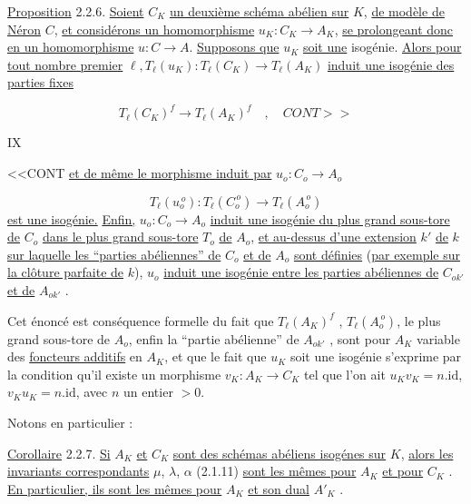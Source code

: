 \underline{Proposition} 2.2.6. \underline{Soient} $C_{K}$ \underline{un deuxième schéma abélien sur} $K$, \underline{de modèle de Néron} $C$, \underline{et considérons un homomorphisme} $u_{K}:C_{K} \longrightarrow A_{K}$, \underline{se prolongeant donc en un homomorphisme} $u: C \longrightarrow A$. \underline{Supposons que} $u_{K}$ \underline{soit une} isogénie. \underline{Alors pour tout nombre premier} $\ell,T_{\ell}(u_{K}):T_{\ell}(C_{K}) \longrightarrow T_{\ell}(A_{K})$ \underline{induit une isogénie des parties fixes}

\begin{equation}\tag{2.2.6.1}
T_{\ell}(C_{K})^{f} \longrightarrow T_{\ell}(A_{K})^{f} \quad , \quad CONT>>
\end{equation}



IX

<<CONT \underline{et de même le morphisme induit par} $u_{o} : C_{o} \longrightarrow A_{o}$

\begin{equation}\tag{2.2.6.2}
T_{\ell}(u_{o}^{\,o}) : T_{\ell}(C_{o}^{\,o}) \longrightarrow T_{\ell}(A_{o}^{\,o})
\end{equation}
\underline{est une isogénie.} \underline{Enfin,} $u_{o} : C_{o} \longrightarrow A_{o}$ \underline{induit une isogénie du plus grand sous-tore de} $C_{o}$ \underline{dans le plus grand sous-tore} $T_{o}$ \underline{de} $A_{o}$, \underline{et au-dessus d'une extension} $k'$ \underline{de} $k$ \underline{sur laquelle les ``parties abéliennes'' de} $C_{o}$ \underline{et de} $A_{o}$ \underline{sont définies} (\underline{par exemple sur la clôture parfaite de} $k$), $u_{o}$ \underline{induit une isogénie entre les parties abéliennes de} $C_{ok'}$ \underline{et de} $A_{ok'}$ .

Cet énoncé est conséquence formelle du fait que $T_{\ell}(A_{K})^{f}$ , $T_{\ell}(A_{o}^{\,o})$, le plus grand sous-tore de $A_{o}$, enfin la ``partie abélienne'' de $A_{ok'}$ , sont pour $A_{K}$ variable des \underline{foncteurs additifs} en $A_{K}$, et que le fait que $u_{K}$ soit une isogénie s'exprime par la condition qu'il existe un morphisme $v_{K}:A_{K} \longrightarrow C_{K}$ tel que l'on ait $u_{K}v_{K} = n.\mathrm{id}$, $v_{K}u_{K} = n.\mathrm{id}$, avec $n$ un entier $> 0$.

Notons en particulier :

\underline{Corollaire} 2.2.7. \underline{Si} $A_{K}$ \underline{et} $C_{K}$ \underline{sont des schémas abéliens isogénes sur} $K$, \underline{alors les invariants correspondants} $\mu$, $\lambda$, $\alpha$ (2.1.11) \underline{sont les mêmes pour} $A_{K}$ \underline{et pour} $C_{K}$ . \underline{En particulier, ils sont les mêmes pour} $A_{K}$ \underline{et son dual} $A'_{K}$ .

